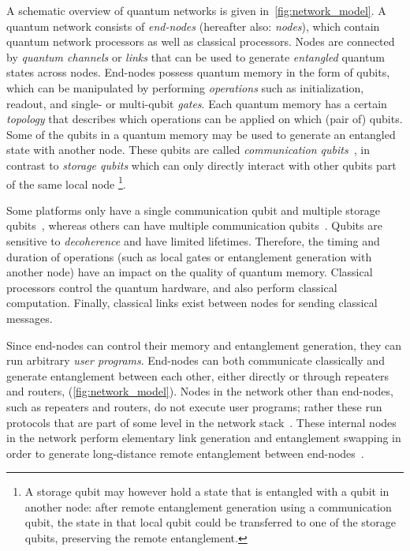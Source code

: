 A schematic overview of quantum networks is given in~\cref{fig:network_model}.
A quantum network consists of \textit{end-nodes} (hereafter also: \textit{nodes}), which contain quantum network processors as well as classical processors.
Nodes are connected by \textit{quantum channels} or \textit{links} that can be used to generate \textit{entangled} quantum states across nodes.
End-nodes possess quantum memory in the form of qubits, which can be manipulated by performing \textit{operations} such as initialization, readout, and single- or multi-qubit \textit{gates}.
Each quantum memory has a certain \textit{topology} that describes which operations can be applied on which (pair of) qubits.
Some of the qubits in a quantum memory may be used to generate an entangled state with another node.
These qubits are called \emph{communication qubits}~\cite{dahlberg2019linklayer}, in contrast to \emph{storage qubits} which can only directly interact with other qubits part of the same local node
\footnote{A storage qubit may however hold a state that is entangled with a qubit in another node: after remote entanglement generation using a communication qubit, the state in that local qubit could be transferred to one of the storage qubits, preserving the remote entanglement.}.

Some platforms only have a single communication qubit and multiple storage qubits~\cite{Bernien2014}, whereas others can have multiple communication qubits~\cite{Inlek2017}.
Qubits are sensitive to \textit{decoherence} and have limited lifetimes.
Therefore, the timing and duration of operations (such as local gates or entanglement generation with another node) have an impact on the quality of quantum memory. Classical processors control the quantum hardware, and also perform classical computation.
Finally, classical links exist between nodes for sending classical messages.

Since end-nodes can control their memory and entanglement generation, they can run arbitrary \textit{user programs}.
End-nodes can both communicate classically and generate entanglement between each other, either directly or through repeaters and routers, (\cref{fig:network_model}). Nodes in the network other than end-nodes, such as repeaters and routers, do not execute user programs; rather these run protocols that are part of some level in the
network stack~\cite{dahlberg2019linklayer,kozlowski2020networklayer}.
These internal nodes in the network perform elementary link generation and entanglement swapping in order to generate long-distance remote entanglement between end-nodes~\cite{dahlberg2019linklayer}.

